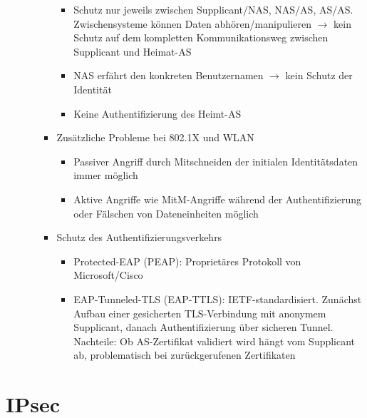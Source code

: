 \begin{itemize}
\begin{itemize}
\begin{itemize}
			\begin{itemize}
				\item Schutz nur jeweils zwischen Supplicant/NAS, NAS/AS, AS/AS. Zwischensysteme können Daten abhören/manipulieren \(\rightarrow\) kein Schutz auf dem kompletten Kommunikationsweg zwischen Supplicant und Heimat-AS
				\item NAS erfährt den konkreten Benutzernamen \(\rightarrow\) kein Schutz der Identität
				\item Keine Authentifizierung des Heimt-AS
			\end{itemize}
			\item Zusätzliche Probleme bei 802.1X und WLAN
			\begin{itemize}
				\item Passiver Angriff durch Mitschneiden der initialen Identitätsdaten immer möglich
				\item Aktive Angriffe wie MitM-Angriffe während der Authentifizierung oder Fälschen von Dateneinheiten möglich
			\end{itemize}
			\item Schutz des Authentifizierungsverkehrs
			\begin{itemize}
				\item Protected-EAP (PEAP): Proprietäres Protokoll von Microsoft/Cisco
				\item EAP-Tunneled-TLS (EAP-TTLS): IETF-standardisiert. Zunächst Aufbau einer gesicherten TLS-Verbindung mit anonymem Supplicant, danach Authentifizierung über sicheren Tunnel. Nachteile: Ob AS-Zertifikat validiert wird hängt vom Supplicant ab, problematisch bei zurückgerufenen Zertifikaten 
			\end{itemize}
		\end{itemize}
	\end{itemize}
\end{itemize}



\section{IPsec}

